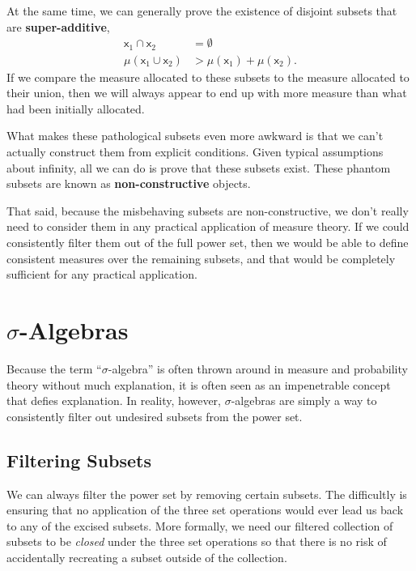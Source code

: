 \documentclass[
  letterpaper,
  DIV=11,
  numbers=noendperiod]{scrartcl}
\begin{document}
At the same time, we can generally prove the existence of disjoint
subsets that are \textbf{super-additive}, \begin{align*}
\mathsf{x}_{1} \cap \mathsf{x}_{2} &= \emptyset
\\
\mu( \mathsf{x}_{1} \cup \mathsf{x}_{2} )
&>
\mu( \mathsf{x}_{1}) + \mu( \mathsf{x}_{2} ).
\end{align*} If we compare the measure allocated to these subsets to the
measure allocated to their union, then we will always appear to end up
with more measure than what had been initially allocated.

What makes these pathological subsets even more awkward is that we can't
actually construct them from explicit conditions. Given typical
assumptions about infinity, all we can do is prove that these subsets
exist. These phantom subsets are known as \textbf{non-constructive}
objects.

That said, because the misbehaving subsets are non-constructive, we
don't really need to consider them in any practical application of
measure theory. If we could consistently filter them out of the full
power set, then we would be able to define consistent measures over the
remaining subsets, and that would be completely sufficient for any
practical application.

\section{\texorpdfstring{{\(\sigma\)}-Algebras}{\textbackslash sigma-Algebras}}\label{sigma-algebras}

Because the term ``\(\sigma\)-algebra'' is often thrown around in
measure and probability theory without much explanation, it is often
seen as an impenetrable concept that defies explanation. In reality,
however, \(\sigma\)-algebras are simply a way to consistently filter out
undesired subsets from the power set.

\subsection{Filtering Subsets}\label{filtering-subsets}

We can always filter the power set by removing certain subsets. The
difficultly is ensuring that no application of the three set operations
would ever lead us back to any of the excised subsets. More formally, we
need our filtered collection of subsets to be \emph{closed} under the
three set operations so that there is no risk of accidentally recreating
a subset outside of the collection.
\end{document}
